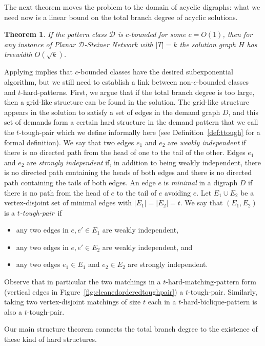 \documentclass[a4paper,11pt]{article}
\newcommand{\calD}{\mathcal{D}}
\theoremstyle{plain}
\newtheorem{theorem}{Theorem}[section]
\newtheorem{identification rule}{Identification Rule}
\theoremstyle{definition}
\theoremstyle{remark}
\newcommand{\Dsnfull}{{\sc Planar $\calD$-Steiner Network}\xspace}
\newcommand{\toughpair}{tough-pair}
\newcommand{\hardbiclique}[1]{$#1$-hard-biclique-pattern}
\newcommand{\hardmatching}[1]{$#1$-hard-matching-pattern}
\begin{document}
The next theorem moves the problem to the domain of acyclic digraphs:
what we need now is a linear bound on the total branch degree of acyclic solutions.

\begin{theorem}\label{thm:subexpalgo}
  If the pattern class $\calD$ is $c$-bounded for some $c=O(1)$, then for any instance of \Dsnfull with $|T|=k$ the solution graph $H$ has treewidth $O(\sqrt{k})$.
\end{theorem}

Applying  implies that $c$-bounded classes have the desired subexponential algorithm, but we still need to establish a link between non-$c$-bounded classes and $t$-hard-patterns. First, we argue that if the total
branch degree is too large, then a grid-like structure
can be found in the solution. The grid-like structure appears in the
solution to satisfy a set of edges in the demand graph $D$, and this set of demands form
a certain hard structure in the demand pattern that we call the $t$-tough-pair which we define informally here (see Definition~\ref{def:ttough} for a formal definition). We say that two edges $e_1$ and $e_2$ are \emph{weakly independent} if there is no directed path from the head of one to the tail of the other. Edges $e_1$ and $e_2$ are \emph{strongly independent} if, in addition to being weakly independent, there is no directed path containing the heads of both edges and there is no directed path containing the tails of both edges. An edge $e$ is {\em minimal} in a digraph $D$ if there is no path from the head of $e$ to the tail of $e$ avoiding $e$. Let $E_1\cup E_2$ be a vertex-disjoint set of minimal edges with $|E_1|=|E_2|=t$. We say that $(E_1,E_2)$ is a \emph{$t$-\toughpair}~if
\begin{itemize}
\item any two edges in $e,e'\in E_1$ are weakly independent,
\item any two edges in $e,e'\in E_2$ are weakly independent, and
\item any two edges $e_1\in E_1$ and $e_2\in E_2$ are strongly independent.
\end{itemize}
  Observe that in particular the two matchings in a \hardmatching{t} form  (vertical edges in Figure~\ref{fig:cleanedorderedtoughpair}) a $t$-\toughpair.
  Similarly, taking two vertex-disjoint matchings of size $t$ each in a \hardbiclique{t} is also a $t$-\toughpair.
  
Our main structure theorem connects the total branch degree to the existence of these kind of hard structures.
\end{document}
